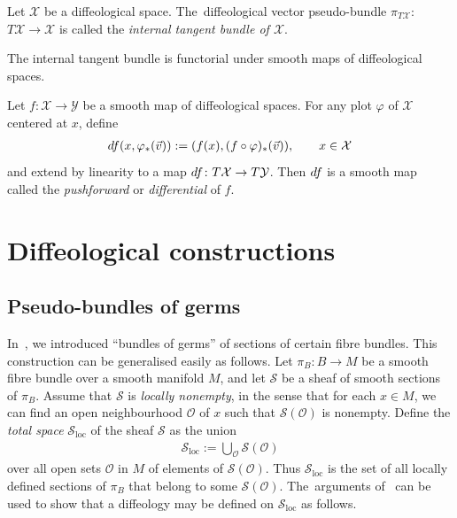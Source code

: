 \documentclass[11pt]{article}
\numberwithin{equation}{section}
\numberwithin{equation}{section}
\def\loc{\operatorname{loc}}
\def\YY{{\mathcal{Y}}}
\def\XX{{\mathcal{X}}}
\def\SS{{\mathscr{S}}}
\begin{document}
\begin{Definition}
Let $\XX$ be a diffeological space. The~diffeological vector pseudo-bundle $\pi_{T\XX}$: $T\XX\rightarrow \XX$ is called the \textit{internal tangent bundle of $\XX$}.
\end{Definition}

The internal tangent bundle is functorial under smooth maps of diffeological spaces.

\begin{Definition}\label{differential}
Let $f\colon \XX\rightarrow \YY$ be a smooth map of diffeological spaces. For any plot $\varphi$ of $\XX$ centered at $x$, define
\begin{gather*}
{\rm d}f(x,\varphi_{*}(\vec{v})):=(f(x),(f\circ\varphi)_{*}(\vec{v})),\qquad x\in \XX
\end{gather*}
and extend by linearity to a map ${\rm d}f\colon T\XX\rightarrow T\YY$. Then ${\rm d}f$ is a smooth map~\cite[Proposition~4.8]{cw} called the \textit{pushforward} or \textit{differential} of $f$.
\end{Definition}


\section{Diffeological constructions}\label{sec3}

\subsection{Pseudo-bundles of germs}\label{pseudobundlesofgerms}

In~\cite{mac3}, we introduced ``bundles of germs'' of sections of certain fibre bundles. This construction can be generalised easily as follows. Let $\pi_{B}\colon B\rightarrow M$ be a smooth fibre bundle over a smooth manifold $M$, and let $\SS$ be a sheaf of smooth sections of $\pi_{B}$. Assume that $\SS$ is \textit{locally nonempty}, in the sense that for each $x\in M$, we can find an open neighbourhood $\mathcal{O}$ of $x$ such that $\SS(\mathcal{O})$ is nonempty. Define the \textit{total space} $\SS_{\loc}$ of the sheaf $\SS$ as the union
\begin{gather*}
\SS_{\loc}:=\bigcup_{\mathcal{O}}\SS(\mathcal{O})
\end{gather*}
over all open sets $\mathcal{O}$ in $M$ of elements of $\SS(\mathcal{O})$. Thus $\SS_{\loc}$ is the set of all locally defined sections of $\pi_{B}$ that belong to some $\SS(\mathcal{O})$. The~arguments of~\cite[Section~1.63]{diffeology} can be used to show that a diffeology may be defined on $\SS_{\loc}$ as follows.
\end{document}
